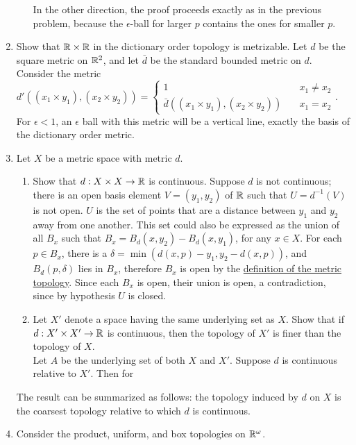 \documentclass[12pt,letterpaper]{article}
\begin{document}
\begin{enumerate}
\begin{enumerate}
    \indent In the other direction, the proof proceeds exactly as in the previous problem, because the $\epsilon$-ball for larger $p$ contains the ones for smaller $p$.
  \end{enumerate}
  \item Show that $\mathbb{R} \times \mathbb{R}$ in the dictionary order topology is metrizable.\hspace{5in}\n
  \indent Let $d$ be the square metric on $\mathbb{R}^2$, and let $\bar{d}$ be the standard bounded metric on $d$. Consider the metric $d'((x_1\times y_1), (x_2\times y_2))= \begin{cases} 1 \quad & x_1\neq x_2 \\ \bar{d}((x_1\times y_1),(x_2\times y_2)) \quad & x_1=x_2\end{cases}$. For $\epsilon<1$, an $\epsilon$ ball with this metric will be a vertical line, exactly the basis of the dictionary order metric.
  \item Let $X$ be a metric space with metric $d$. \begin{enumerate}
    \item Show that $d:X\times X \rightarrow \mathbb{R}$ is continuous. \hspace{5in}\n
    \indent Suppose $d$ is not continuous; there is an open basis element $V=(y_1,y_2)$ of $\mathbb{R}$ such that $U=d^{-1}(V)$ is not open. $U$ is the set of points that are a distance between $y_1$ and $y_2$ away from one another. This set could also be expressed as the union of all $B_x$ such that $B_x = B_d(x,y_2) - B_d(x,y_1)$, for any $x\in X$. For each $p\in B_x$, there is a $\delta = \min(d(x,p)-y_1, y_2-d(x,p))$, and $B_d(p,\delta)$ lies in $B_x$, therefore $B_x$ is open by the \hyperref[dfn:metricTopology]{definition of the metric topology}. Since each $B_x$ is open, their union is open, a contradiction, since by hypothesis $U$ is closed. 
    \item Let $X'$ denote a space having the same underlying set as $X$. Show that if \\\noindent$d: X'\times X'\rightarrow \mathbb{R}$ is continuous, then the topology of $X'$ is finer than the topology of $X$.\\
    Let $A$ be the underlying set of both $X$ and $X'$. Suppose $d$ is continuous relative to $X'$. Then for 
  \end{enumerate}
  The result can be summarized as follows: the topology induced by $d$ on $X$ is the coarsest topology relative to which $d$ is continuous.
  \item Consider the product, uniform, and box topologies on $\mathbb{R}^\omega$.

\end{enumerate}
\end{document}
